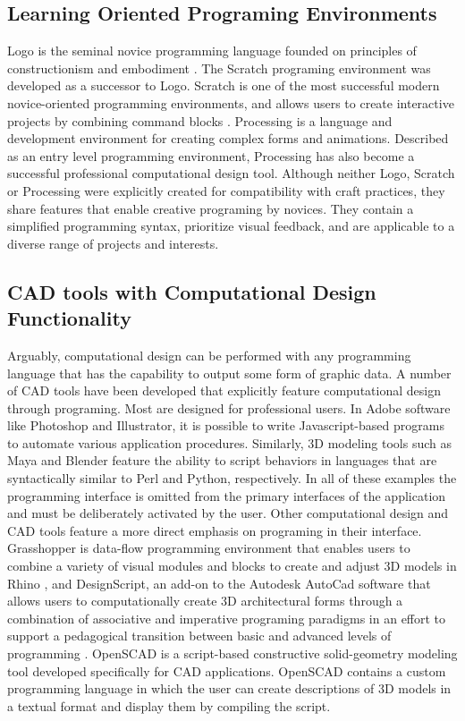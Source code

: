 \documentclass{sigchi}
\begin{document}
\subsection{Learning Oriented Programing Environments}
Logo is the seminal novice programming language founded on principles of constructionism and embodiment \cite{papert}. The Scratch programing environment was developed as a successor to Logo. Scratch is one of the most successful modern novice-oriented programming environments, and allows users to create interactive projects by combining command blocks \cite{resnick2}. Processing is a language and development environment for creating complex forms and animations. Described as an entry level programming environment, Processing has also become a successful professional computational design tool\cite{processing}. Although neither Logo, Scratch or Processing were explicitly created for compatibility with craft practices, they share features that enable creative programing by novices. They contain a simplified programming syntax, prioritize visual feedback, and are applicable to a diverse range of projects and interests.

\subsection{CAD tools with Computational Design Functionality} %
Arguably, computational design can be performed with any programming language that has the capability to output some form of graphic data. A number of CAD tools have been developed that explicitly feature computational design through programing. Most are designed for professional users. In Adobe software like Photoshop and Illustrator, it is possible to write Javascript-based programs to automate various application procedures. Similarly, 3D modeling tools such as Maya and Blender feature the ability to script behaviors in languages that are syntactically similar to Perl and Python, respectively. In all of these examples the programming interface is omitted from the primary interfaces of the application and must be deliberately activated by the user. Other computational design and CAD tools feature a more direct emphasis on programing in their interface. Grasshopper is data-flow programming environment that enables users to combine a variety of visual modules and blocks to create and adjust 3D models in Rhino \cite{grasshopper}, and DesignScript, an add-on to the Autodesk AutoCad software  that allows users to computationally create 3D architectural forms through a combination of associative and imperative programing paradigms in an effort to support a pedagogical transition between basic and advanced levels of programming \cite{DesignScript}. OpenSCAD is a script-based constructive solid-geometry modeling tool developed specifically for CAD applications. OpenSCAD contains a custom programming language in which the user can create descriptions of 3D models in a textual format and display them by compiling the script\cite{OpenScad}.
\end{document}
